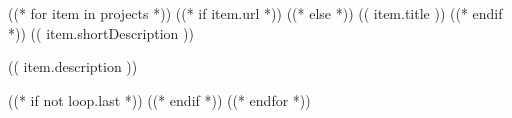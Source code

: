 
((* for item in projects *))
  \cvevent
    {((* if item.url *))  ((* else *)) (( item.title )) ((* endif *))}
    {(( item.shortDescription ))}
    {}
    {}
  \vspace{-0.5em}
  {\small{(( item.description ))}\par}
  ((* if not loop.last *))
    \divider
  ((* endif *))
((* endfor *))
